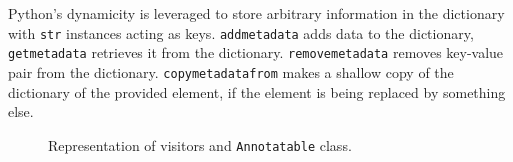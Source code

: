 Python's dynamicity is leveraged to store arbitrary information in the dictionary with \texttt{str} instances acting as keys. \texttt{addmetadata} adds data to the dictionary, \texttt{getmetadata} retrieves it from the dictionary. \texttt{removemetadata} removes key-value pair from the dictionary. \texttt{copymetadatafrom} makes a shallow copy of the dictionary of the provided element, if the element is being replaced by something else.

\begin{figure}[ht]
	\centering
	\caption{Representation of visitors and \texttt{Annotatable} class.}
\label{class-diagram-visitors}
\end{figure}

\FloatBarrier
